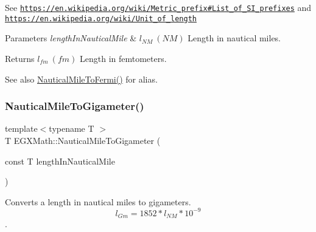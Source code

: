 See \href{https://en.wikipedia.org/wiki/Metric_prefix#List_of_SI_prefixes}{\tt https\+://en.\+wikipedia.\+org/wiki/\+Metric\+\_\+prefix\#\+List\+\_\+of\+\_\+\+S\+I\+\_\+prefixes} and \href{https://en.wikipedia.org/wiki/Unit_of_length}{\tt https\+://en.\+wikipedia.\+org/wiki/\+Unit\+\_\+of\+\_\+length} 
\begin{DoxyParams}{Parameters}
{\em length\+In\+Nautical\+Mile} & $ l_{NM}\ (NM)$ Length in nautical miles. \\
\hline
\end{DoxyParams}
\begin{DoxyReturn}{Returns}
$ l_{fm}\ (fm)$ Length in femtometers. 
\end{DoxyReturn}
\begin{DoxySeeAlso}{See also}
\mbox{\hyperlink{group___e_g_x_math-_conversions-_length_conversions-_non-_s_i-_nautical_mile-_non-_s_i_gaa4b84422943c37e49e5c3abdc7f301e4}{Nautical\+Mile\+To\+Fermi()}} for alias. 
\end{DoxySeeAlso}
\mbox{\label{group___e_g_x_math-_conversions-_length_conversions-_non-_s_i-_nautical_mile-_s_i_ga88b5a7dada605b923f1855f3ea4d4dc0}} 
\subsubsection{\texorpdfstring{Nautical\+Mile\+To\+Gigameter()}{NauticalMileToGigameter()}}
{\footnotesize\ttfamily template$<$typename T $>$ \\
T E\+G\+X\+Math\+::\+Nautical\+Mile\+To\+Gigameter (\begin{DoxyParamCaption}\item[{const T}]{length\+In\+Nautical\+Mile }\end{DoxyParamCaption})}



Converts a length in nautical miles to gigameters. \[ l_{Gm}=1852 * l_{NM} * 10^{-9} \]. 

